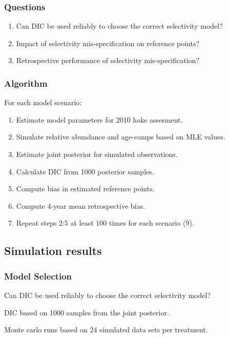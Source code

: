 \documentclass{beamer}
\begin{document}
\begin{frame}[m]\frametitle{Questions}
    \begin{enumerate}
    	\item Can DIC be used reliably to choose the correct selectivity model?
    	\item Impact of selectivity mis-specification on reference points?
    	\item Retrospective performance of selectivity mis-specification?
    \end{enumerate}
\end{frame}

\begin{frame}[m]\frametitle{Algorithm}
    For each model scenario:
	\begin{enumerate}
		\item Estimate model parameters for 2010 hake assesment.
		\item Simulate relative abundance and age-comps based on MLE values.
		\item Estimate joint posterior for simulated observations.
		\item Calculate DIC from 1000 posterior samples.
		\item Compute bias in estimated reference points.
		\item Compute 4-year mean retrospective bias.
		\item Repeat steps 2:5 at least 100 times for each scenario (9).
	\end{enumerate}

\end{frame}



\subsection{Simulation results} %
\label{sub:simulation_results}

\begin{frame}[m]\frametitle{Model Selection}	
	\begin{block}
    {Can DIC be used reliably to choose the correct selectivity model?}
	    
	    
	    DIC based on 1000 samples from the joint posterior.
	    
	    Monte carlo runs based on 24 simulated data sets per treatment.
	    
	\end{block}
\end{frame}
\end{document}
